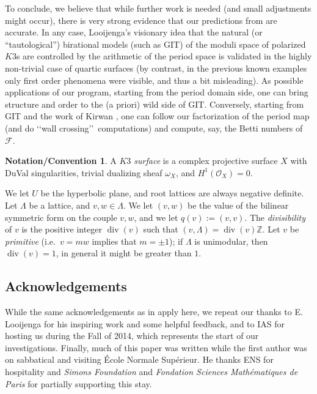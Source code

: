 \documentclass[11pt]{amsart}
\numberwithin{equation}{section}
\theoremstyle{plain}
\theoremstyle{remark}
\theoremstyle{definition}
\newtheorem{notationconv}[theorem]{Notation/Convention}
\newcommand{\cF}{\mathscr{F}}
\newcommand{\cO}{{\mathscr O}}
\newcommand{\ZZ}{{\mathbb Z}}
\DeclareMathOperator{\divisore}{div}
\begin{document}
\smallskip

To conclude, we believe that while further work is needed (and small adjustments might occur), there is very strong evidence that our predictions from \cite{log1} are 
 accurate. In any case, Looijenga's visionary idea that the natural (or ``tautological'') birational models (such as GIT) of the moduli space of polarized $K3$s are controlled by the arithmetic of the period space is validated in the highly non-trivial case of quartic surfaces (by contrast, in the previous known examples \cite{shah,looijengavancouver,lcubic,cubic4fold,ls,act} only first order phenomena were visible, and thus a bit misleading). As possible applications of our program,  starting from the period domain side, one can bring structure and order to the (a priori) wild side of GIT. Conversely, starting from GIT and the work of Kirwan \cite{kirwan,kirwanhyp}, one can follow our factorization of the period map (and do \lq\lq wall crossing\rq\rq\ computations) and compute, say, the Betti numbers of $\cF$. 
 


\begin{notationconv}
%
A \emph{$K3$ surface} is a complex projective surface $X$ with DuVal singularities,  trivial dualizing sheaf  $\omega_X$, and $H^1(\cO_X)=0$. 

We let $U$ be the hyperbolic plane, and root lattices are always negative definite. Let $\Lambda$ be a lattice, and $v,w\in\Lambda$. We let $(v,w)$ be the value of the bilinear symmetric form on the couple $v,w$, and we let $q(v):=(v,v)$.
The \emph{divisibility} of $v$ is the positive integer $\divisore(v)$ such that $(v,\Lambda)=\divisore(v)\ZZ$. Let $v$ be \emph{primitive} (i.e.~$v=mw$ implies that $m=\pm 1$); if $\Lambda$ is unimodular, then 
$\divisore(v)=1$, in general it might be greater than $1$.
%
\end{notationconv}



\subsection*{Acknowledgements} 

While the same acknowledgements as in \cite{log1} apply here, we repeat our thanks to E. Looijenga for his inspiring work and some helpful feedback, and to IAS for hosting us during the Fall of 2014, which represents the start of our investigations. Finally, much of this paper was written while the first author was on sabbatical and visiting \'Ecole Normale Sup\'erieur. He thanks ENS for hospitality and  {\it Simons Foundation} and {\it Fondation Sciences Math\'ematiques de Paris} for partially supporting this stay. 
\end{document}
